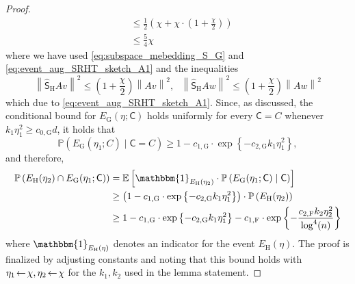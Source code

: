 \documentclass[11pt]{article}
\theoremstyle{definition}
\theoremstyle{plain}
\newcommand{\Norm}[1]{\left\| #1 \right\|}
\providecommand{\norm}[1]{\Norm{#1}}
\providecommand{\bbE}{\mathbb{E}}
\providecommand{\E}[1]{\bbE \left[ #1 \right]}
\begin{document}
\begin{proof}
\begin{align}
    &\leq \frac{1}{2}\left(\chi + \chi\cdot \left(1 + \frac{\chi}{2}\right)\right)\\
    &\leq \frac{5}{4}\chi
\end{align}
where we have used \eqref{eq:subspace_mebedding_S_G} and \eqref{eq:event_aug_SRHT_sketch_A1} and the inequalities 
\begin{equation}
    \norm{\widehat{\mathsf{S}}_{\mathrm{H}}Av}^2 \leq \left(1 + \frac{\chi}{2}\right)\norm{Av}^2, \ \ \ \norm{\widehat{\mathsf{S}}_{\mathrm{H}}Aw}^2 \leq \left(1 + \frac{\chi}{2}\right)\norm{Aw}^2  
\end{equation}
which due to \eqref{eq:event_aug_SRHT_sketch_A1}. Since, as discussed, the conditional bound for $E_{\mathrm{G}}(\eta; \mathsf{C})$ holds uniformly for every $\mathsf{C} = C$ whenever $k_1\eta^2_1 \geq c_{0, \mathrm{G}}d$, it holds that 
\begin{equation}
    \mathbb{P}\left(E_{\mathrm{G}}(\eta_1; C) \mid \mathsf{C} = C\right)
    \ge 1 - c_{1, \mathrm{G}}\cdot \exp\left\{-c_{2, \mathrm{G}}k_1\eta^2_1\right\},
\end{equation}
and therefore,
\begin{align}
    \mathbb{P}\left(E_{\mathrm{H}}(\eta_2) \cap E_{\mathrm{G}}(\eta_1; \mathsf{C})\right)
    &= \E{\mathbbm{1}_{E_{\mathrm{H}}(\eta_2)}\cdot \mathbb{P}\left(E_{\mathrm{G}}(\eta_1; \mathsf{C}) \mid \mathsf{C}\right)} \\
    &\ge \left(1 - c_{1, \mathrm{G}}\cdot \exp\left\{-c_{2, \mathrm{G}}k_1\eta^2_1\right\}\right)\cdot \mathbb{P}\left(E_{\mathrm{H}}(\eta_2)\right) \\
    &\ge 1 - c_{1, \mathrm{G}}\cdot \exp\left\{-c_{2, \mathrm{G}}k_1\eta^2_1\right\}
       - c_{1, \mathrm{F}}\cdot \exp\left\{-\frac{c_{2, \mathrm{F}}k_2\eta^2_2}{\log^4(n)}\right\}
\end{align}
where $\mathbbm{1}_{E_{\mathrm{H}}(\eta)}$ denotes an indicator for the event $E_{\mathrm{H}}(\eta)$. The proof is finalized by adjusting constants and noting that this bound holds with $\eta_1\hspace{-0.15em}\gets\hspace{-0.15em} \chi, \eta_2\hspace{-0.15em}\gets\hspace{-0.15em}\chi$ for the $k_1, k_2$ used in the lemma statement. 
\end{proof}
\end{document}
